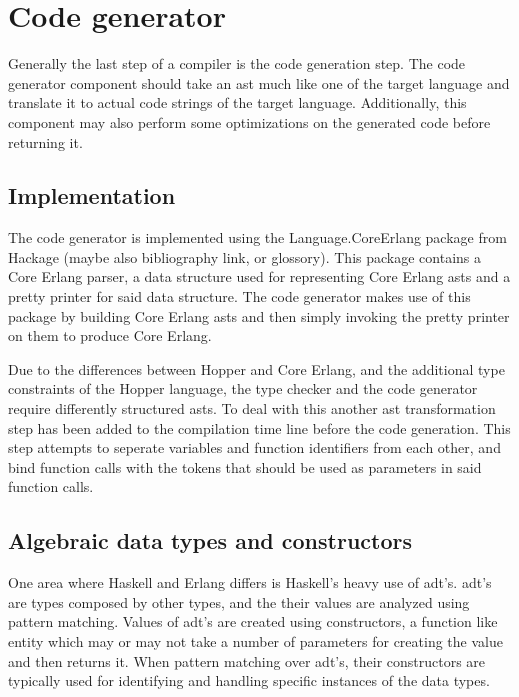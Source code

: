 \section{Code generator}


Generally the last step of a compiler is the code generation step. The code generator
component should take an \gls{ast} much like one of the target language and translate it
to actual code strings of the target language. Additionally, this component may also
perform some optimizations on the generated code before returning it.

\subsection{Implementation}

The code generator is implemented using the Language.CoreErlang \cite{CoreErlang} package
from Hackage (maybe also bibliography link, or glossory). This package contains a Core Erlang
parser, a data structure used for representing Core Erlang \gls{ast}s and a pretty printer for
said data structure. The code generator makes use of this package by building Core Erlang
\gls{ast}s and then simply invoking the pretty printer on them to  produce Core Erlang.

Due to the differences between Hopper and Core Erlang, and the additional type constraints
of the Hopper language, the type checker and the code generator require differently
structured \gls{ast}s. To deal with this another \gls{ast} transformation step has been added
to the compilation time line before the code generation. This step attempts to seperate variables
and function identifiers from each other, and bind function calls with the tokens that
should be used as parameters in said function calls.

\subsection{Algebraic data types and constructors}

One area where Haskell and Erlang differs is Haskell's heavy use of \gls{adt}'s. \gls{adt}'s are types 
composed by other types, and the their values are analyzed using pattern matching. Values of
\gls{adt}'s are created using constructors, a function like entity which may or may not take a number
of parameters for creating the value and then returns it. When pattern matching over \gls{adt}'s, their
constructors are typically used for identifying and handling specific instances of the data types.

